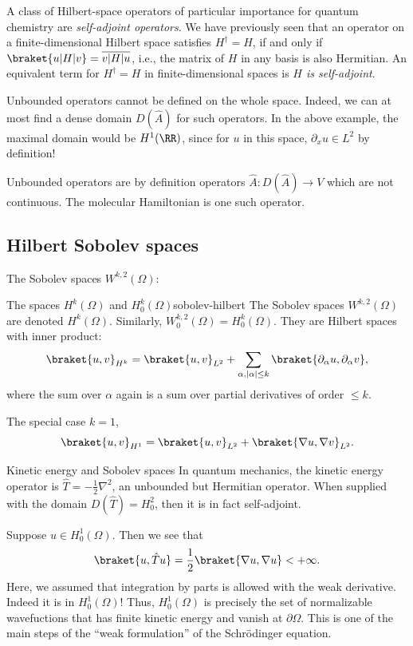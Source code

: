 A class of Hilbert-space operators of particular importance for quantum chemistry are \emph{self-adjoint operators}. We have previously seen that an operator on a finite-dimensional Hilbert space satisfies $H^\dag = H$, if and only if $\braket{u|H|v} = \overline{v|H|u}$, i.e., the matrix of $H$ in any basis is also Hermitian. An equivalent term for $H^\dag = H$ in finite-dimensional spaces is \emph{$H$ is self-adjoint}.


Unbounded operators cannot be defined on the whole space. Indeed, we can at most find a dense domain $D(\hat{A})$ for such operators. In the above example, the maximal domain would be $H^1(\RR)$, since for $u$ in this space,  $\partial_x u \in L^2$ by definition!

Unbounded operators are by definition operators $\hat{A} :D(\hat{A}) \to V$ which are not continuous. The molecular Hamiltonian is one such operator.


\subsection{Hilbert Sobolev spaces}

The Sobolev spaces $W^{k,2}(\Omega)$:
\begin{myDefinition}{The spaces $H^k(\Omega)$ and $H^k_0(\Omega)$}{sobolev-hilbert}
The Sobolev spaces $W^{k,2}(\Omega)$ are denoted $H^k(\Omega)$. Similarly, $W^{k,2}_0(\Omega) = H^k_0(\Omega)$. They are Hilbert spaces with inner product:
\begin{equation}
    \braket{u,v}_{H^k} = \braket{u,v}_{L^2} + \sum_{\alpha, |\alpha|\leq k} \braket{\partial_\alpha u, \partial_\alpha v},
\end{equation}
where the sum over $\alpha$ again is a sum over partial derivatives of order $\leq k$.

The special case $k=1$,
\begin{equation}
    \braket{u,v}_{H^1} = \braket{u,v}_{L^2} +  \braket{\nabla u, \nabla v}_{L^2}.
\end{equation}
\end{myDefinition}

\begin{myRemark}{Kinetic energy and Sobolev spaces}{}
In quantum mechanics, the kinetic energy operator is $\hat{T} = -\frac{1}{2}\nabla^2$, an unbounded but Hermitian operator. When supplied with the domain $D(\hat{T}) = H^2_0$, then it is in fact self-adjoint.

Suppose $u \in H^1_0(\Omega)$. Then we see that
\begin{equation}
    \braket{u,\hat{T} u} = \frac{1}{2} \braket{\nabla u, \nabla u} < +\infty.
\end{equation}
Here, we assumed that integration by parts is allowed with the weak derivative. Indeed it is in $H^1_0(\Omega)$! Thus, $H^1_0(\Omega)$ is precisely the set of normalizable wavefuctions that has finite kinetic energy and vanish at $\partial \Omega$. This is one of the main steps of the ``weak formulation'' of the Schrödinger equation.
\end{myRemark}


